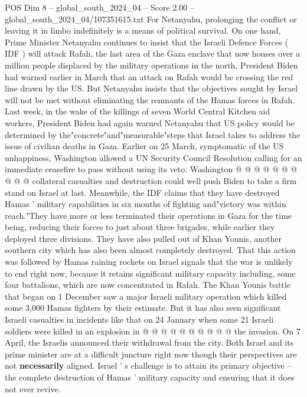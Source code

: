 \begin{textsample}{POS Dim 8 – global\_south\_2024\_04 – Score 2.00 – global\_south\_2024\_04/107351615.txt}  \label{ex:f8_pos_417}
For Netanyahu, prolonging the conflict or leaving it in limbo indefinitely is a means of political survival.
On one hand, Prime Minister Netanyahu continues to insist that the Israeli Defence Forces ( IDF ) will attack Rafah, the last area of the Gaza enclave that now houses over a million people displaced by the military operations in the north.
President Biden had warned earlier in March that an attack on Rafah would be crossing the red line drawn by the US.
But Netanyahu insists that the objectives sought by Israel will not be met without eliminating the remnants of the Hamas forces in Rafah.
Last week, in the wake of the killings of seven World Central Kitchen aid workers, President Biden had again warned Netanyahu that US policy would be determined by the"concrete"and"measurable"steps that Israel takes to address the issue of civilian deaths in Gaza.
Earlier on 25 March, symptomatic of the US unhappiness, Washington allowed a UN Security Council Resolution calling for an immediate ceasefire to pass without using its veto.
Washington @ @ @ @ @ @ @ @ @ @ collateral casualties and destruction could well push Biden to take a firm stand on Israel at last.
Meanwhile, the IDF claims that they have destroyed Hamas ' military capabilities in six months of fighting and"victory was within reach."They have more or less terminated their operations in Gaza for the time being, reducing their forces to just about three brigades, while earlier they deployed three divisions.
They have also pulled out of Khan Younis, another southern city which has also been almost completely destroyed.
That this action was followed by Hamas raining rockets on Israel signals that the war is unlikely to end right now, because it retains significant military capacity including, some four battalions, which are now concentrated in Rafah.
The Khan Younis battle that began on 1 December saw a major Israeli military operation which killed some 3,000 Hamas fighters by their estimate.
But it has also seen significant Israeli casualties in incidents like that on 24 January when some 21 Israeli soldiers were killed in an explosion in @ @ @ @ @ @ @ @ @ @ the invasion.
On 7 April, the Israelis announced their withdrawal from the city.
Both Israel and its prime minister are at a difficult juncture right now though their perspectives are not \textbf{necessarily} aligned.
Israel ' s challenge is to attain its primary objective -- the complete destruction of Hamas ' military capacity and ensuring that it does not ever revive.

\end{textsample}
